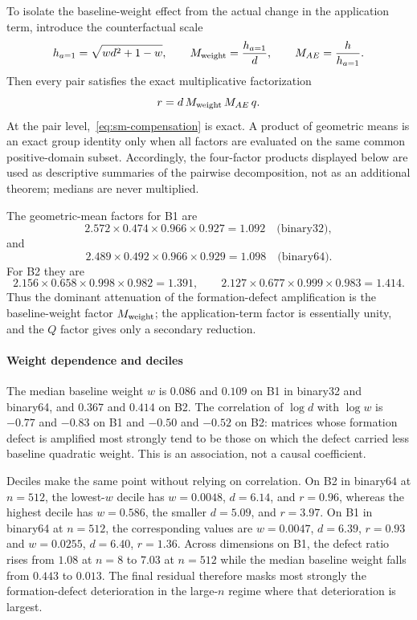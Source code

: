 \documentclass[supplement,review,onefignum,onetabnum]{siamart251216}
\begin{document}
To isolate the baseline-weight effect from the actual change in the application term, introduce
the counterfactual scale
%
\[
h_{a=1}=\sqrt{wd^2+1-w},
\qquad
M_{\rm weight}=\frac{h_{a=1}}{d},
\qquad
M_{AE}=\frac{h}{h_{a=1}}.
\]
%
Then every pair satisfies the exact multiplicative factorization
%
\begin{equation}\label{eq:sm-compensation}
r=d\,M_{\rm weight}\,M_{AE}\,q.
\end{equation}
%
At the pair level,~\eqref{eq:sm-compensation} is exact.  A product of geometric means is an exact
group identity only when all factors are evaluated on the same common positive-domain subset.
Accordingly, the four-factor products displayed below are used as descriptive summaries of the
pairwise decomposition, not as an additional theorem; medians are never multiplied.

The geometric-mean factors for B1 are
%
\[
2.572\times0.474\times0.966\times0.927=1.092
\quad\text{(binary32)},
\]
%
and
%
\[
2.489\times0.492\times0.966\times0.929=1.098
\quad\text{(binary64)}.
\]
%
For B2 they are
%
\[
2.156\times0.658\times0.998\times0.982=1.391,
\qquad
2.127\times0.677\times0.999\times0.983=1.414.
\]
%
Thus the dominant attenuation of the formation-defect amplification is the baseline-weight factor
$M_{\rm weight}$; the application-term factor is essentially unity, and the $Q$ factor gives only a
secondary reduction.

\paragraph{Weight dependence and deciles}
The median baseline weight $w$ is $0.086$ and $0.109$ on B1 in binary32 and binary64, and $0.367$
and $0.414$ on B2. The correlation of $\log d$ with $\log w$ is $-0.77$ and $-0.83$ on B1 and
$-0.50$ and $-0.52$ on B2: matrices whose formation defect is amplified most strongly tend to be
those on which the defect carried less baseline quadratic weight. This is an association, not a
causal coefficient.

Deciles make the same point without relying on correlation. On B2 in binary64 at $n=512$, the
lowest-$w$ decile has $w=0.0048$, $d=6.14$, and $r=0.96$, whereas the highest decile has
$w=0.586$, the smaller $d=5.09$, and $r=3.97$. On B1 in binary64 at $n=512$, the corresponding
values are $w=0.0047$, $d=6.39$, $r=0.93$ and $w=0.0255$, $d=6.40$, $r=1.36$. Across dimensions
on B1, the defect ratio rises from $1.08$ at $n=8$ to $7.03$ at $n=512$ while the median baseline
weight falls from $0.443$ to $0.013$. The final residual therefore masks most strongly the
formation-defect deterioration in the large-$n$ regime where that deterioration is largest.
\end{document}
